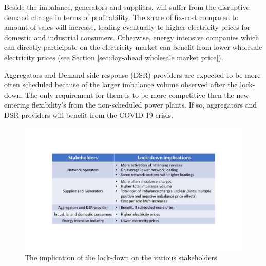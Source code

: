 \documentclass[energies,article,submit,moreauthors,pdftex]{Definitions/mdpi}
\begin{document}
Beside the imbalance, generators and suppliers, will suffer from the disruptive demand change in terms of profitability. The share of fix-cost compared to amount of sales will increase, leading eventually to higher electricity prices for domestic and industrial consumers. Otherwise, energy intensive companies which can directly participate on the electricity market can benefit from lower wholesale electricity prices (see Section \ref{sec:day-ahead wholesale market price}).

Aggregators and Demand side response (DSR) providers are expected to be more often scheduled because of the larger imbalance volume observed after the lock-down. The only requirement for them is to be more competitive then the new entering flexibility's from the non-scheduled power plants. If so, aggregators and DSR providers will benefit from the COVID-19 crisis.

\begin{figure}[H]
\centering
\hspace{-25pt}
\includegraphics[trim={2cm 3cm 2cm 3.5cm},clip,width=1\textwidth]{Graphics/Stakeholder - lock-down implications.pdf}
\caption{The implication of the lock-down on the various stakeholders}
\label{fig:imbalance-price-trade-off}
\end{figure} 
\end{document}

